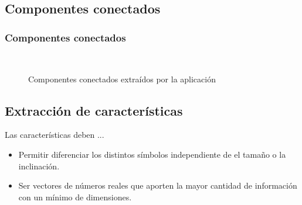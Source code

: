 \documentclass{beamer}
\begin{document}
	\subsection{Componentes conectados}
	\begin{frame}
	\frametitle{Componentes conectados}
	\begin{figure}
	\centering
		\hspace{1cm}
		\\		
	\caption{Componentes conectados extraídos por la aplicación}
	\label{fig:concomp}
	\end{figure}
	\end{frame}
	
	\subsection{Extracción de características}
	\begin{frame}
	\begin{block}{Las características deben ...}
	\begin{itemize}
		\item Permitir diferenciar los distintos símbolos independiente de el tamaño o la inclinación.
		\item Ser vectores de números reales que aporten la mayor cantidad de información con un mínimo de dimensiones.
	\end{itemize}
	\end{block}
	\end{frame}
	
\end{document}
